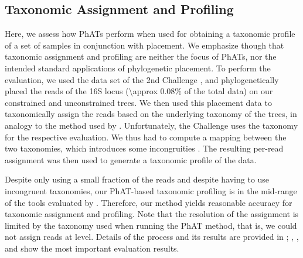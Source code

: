
\subsection{Taxonomic Assignment and Profiling}
\label{ch:AutomaticTrees:sec:Evaluation:sub:TaxonomicAssignmentProfiling}

Here, we assess how \acp{PhAT} perform when used for obtaining a taxonomic profile of a set of samples in conjunction with placement.
We emphasize though that taxonomic assignment and profiling are neither the focus of \acp{PhAT},
nor the intended standard applications of phylogenetic placement.
To perform the evaluation,
we used the  data set of the 2nd  Challenge \citep{Sczyrba2017,Bremges2018},
and phylogenetically placed the reads of the  16S locus (\num{\approx 0.08}\% of the total data)
on our constrained and unconstrained  trees.
We then used this placement data to taxonomically assign the reads
based on the underlying  taxonomy of the trees,
in analogy to the method used by  \citep{Kozlov2016}.
Unfortunately, the  Challenge uses the  taxonomy for the respective evaluation.
We thus had to compute a mapping between the two taxonomies, which introduces some incongruities \citep{Balvociute2017}.
The resulting per-read assignment was then used to generate a taxonomic profile of the data.

Despite only using a small fraction of the reads and despite having to use incongruent taxonomies,
our PhAT-based taxonomic profiling is in the mid-range of the tools evaluated by .
Therefore, our method yields reasonable accuracy for taxonomic assignment and profiling.
Note that the resolution of the assignment is limited by the taxonomy used when running the \ac{PhAT} method,
that is, we could not assign reads at  level.
Details of the process and its results are provided in ;
, , and  show the most important evaluation results.


